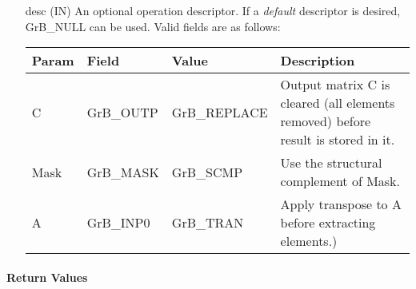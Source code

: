 \begin{itemize}[leftmargin=1in]
    \item[{\sf desc}]  ({\sf IN}) An optional operation descriptor.  If a 
    \emph{default} descriptor is desired, {\sf GrB\_NULL} can be used.  Valid 
    fields are as follows: \\
    
    \begin{tabular}{lllp{2.5in}}
        Param & Field  & Value & Description \\
        \hline
        {\sf C}    & {\sf GrB\_OUTP} & {\sf GrB\_REPLACE} & Output matrix {\sf C} 
        is cleared (all elements removed) before result is stored in it. \\
    
        {\sf Mask} & {\sf GrB\_MASK} & {\sf GrB\_SCMP}   & Use the structural 
        complement of {\sf Mask}. \\
    
        {\sf A}    & {\sf GrB\_INP0} & {\sf GrB\_TRAN}   & Apply transpose to {\sf A} 
        before extracting elements.) \\
    \end{tabular}
\end{itemize}

\paragraph{Return Values}

